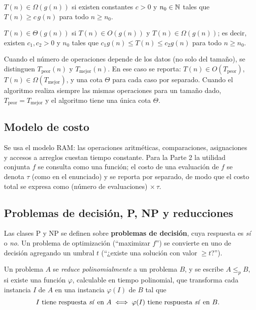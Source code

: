 \begin{definicion}
$T(n) \in \Omega(g(n))$ si existen constantes $c > 0$ y $n_0 \in \mathbb{N}$ tales que $T(n) \ge c\, g(n)$ para todo $n \ge n_0$.
\end{definicion}

\begin{definicion}
$T(n) \in \Theta(g(n))$ si $T(n) \in O(g(n))$ y $T(n) \in \Omega(g(n))$; es decir, existen $c_1, c_2 > 0$ y $n_0$ tales que $c_1 g(n) \le T(n) \le c_2 g(n)$ para todo $n \ge n_0$.
\end{definicion}

\begin{observacion}\label{obs:casos}
Cuando el número de operaciones depende de los datos (no solo del tamaño), se distinguen $T_{\text{peor}}(n)$ y $T_{\text{mejor}}(n)$. En ese caso se reporta: $T(n)\in O(T_{\text{peor}})$, $T(n)\in\Omega(T_{\text{mejor}})$, y una cota $\Theta$ para cada caso por separado. Cuando el algoritmo realiza siempre las mismas operaciones para un tamaño dado, $T_{\text{peor}} = T_{\text{mejor}}$ y el algoritmo tiene una única cota $\Theta$.
\end{observacion}

\subsection{Modelo de costo}

Se usa el modelo RAM: las operaciones aritméticas, comparaciones, asignaciones y accesos a arreglos cuestan tiempo constante. Para la Parte 2 la utilidad conjunta $f$ se consulta como una función; el costo de una evaluación de $f$ se denota $\tau$ (como en el enunciado) y se reporta por separado, de modo que el costo total se expresa como (número de evaluaciones)$\,\times \tau$.

\subsection{Problemas de decisión, P, NP y reducciones}

Las clases P y NP se definen sobre \textbf{problemas de decisión}, cuya respuesta es \emph{sí} o \emph{no}. Un problema de optimización (``maximizar $f$'') se convierte en uno de decisión agregando un umbral $t$ (``¿existe una solución con valor $\ge t$?'').

\begin{definicion}
Un problema $A$ se \emph{reduce polinomialmente} a un problema $B$, y se escribe $A \le_p B$, si existe una función $\varphi$, calculable en tiempo polinomial, que transforma cada instancia $I$ de $A$ en una instancia $\varphi(I)$ de $B$ tal que
\[
I \text{ tiene respuesta \emph{sí} en } A \iff \varphi(I) \text{ tiene respuesta \emph{sí} en } B.
\]
\end{definicion}

